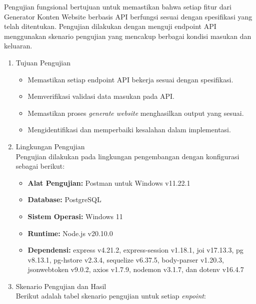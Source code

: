 Pengujian fungsional bertujuan untuk memastikan bahwa setiap fitur dari Generator Konten Website berbasis API berfungsi sesuai dengan spesifikasi yang telah ditentukan. Pengujian dilakukan dengan menguji endpoint API menggunakan skenario pengujian yang mencakup berbagai kondisi masukan dan keluaran.

\begin{enumerate}[label*=\arabic*.,ref=\arabic*]
    \item Tujuan Pengujian
        \begin{itemize}
            \item Memastikan setiap endpoint API bekerja sesuai dengan spesifikasi.
            \item Memverifikasi validasi data masukan pada API.
            \item Memastikan proses \textit{generate website} menghasilkan output yang sesuai.
            \item Mengidentifikasi dan memperbaiki kesalahan dalam implementasi.
        \end{itemize}
    
    \item Lingkungan Pengujian\\
        Pengujian dilakukan pada lingkungan pengembangan dengan konfigurasi sebagai berikut:
        \begin{itemize}
            \item \textbf{Alat Pengujian:} Postman untuk Windows v11.22.1
            \item \textbf{Database:} PostgreSQL
            \item \textbf{Sistem Operasi:} Windows 11
            \item \textbf{Runtime:} Node.js v20.10.0
            \item \textbf{Dependensi:} express v4.21.2, express-session v1.18.1, joi v17.13.3, pg v8.13.1, pg-hstore v2.3.4, sequelize v6.37.5, body-parser v1.20.3, jsonwebtoken v9.0.2, axios v1.7.9, nodemon v3.1.7, dan dotenv v16.4.7
        \end{itemize}
    
    \item Skenario Pengujian dan Hasil\\
        Berikut adalah tabel skenario pengujian untuk setiap \textit{enpoint}:
        
\end{enumerate}